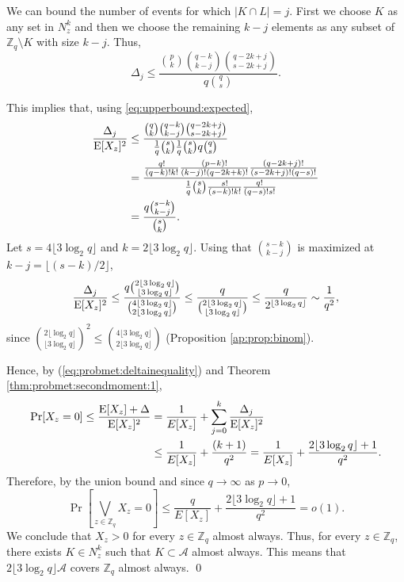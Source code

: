 We can bound the number of events for which $|K \cap L| = j$. First we choose $K$ as any set in $N_z^k$ and then we choose the remaining $k- j$ elements as any subset of $\mathbb{Z}_q \setminus K$ with size $k - j$. Thus, 
\[\Delta_j \leq \frac{\binom{p}{k} \binom{q - k}{k - j}\binom{q - 2k + j}{s - 2k + j}}{q\binom{q}{s}}.\]
\par This implies that, using \ref{eq:upperbound:expected},
\begin{align*}
    \frac{\Delta_j}{\mathrm{E}[X_z]^2} &\leq \frac{\binom{q}{k} \binom{q - k}{k - j}\binom{q - 2k + j}{s - 2k + j}}{\frac{1}{q} \binom{s}{k}\frac{1}{q} \binom{s}{k}q\binom{q}{s}} \\
    &= \frac{\frac{q!}{(q - k)!k!}\frac{(p - k)!}{(k - j)!(q - 2k + k)!}\frac{(q - 2k + j)!}{(s - 2k + j)!(q - s)!}}{\frac{1}{q}\binom{s}{k}\frac{s!}{(s - k)!k!}\frac{q!}{(q - s)!s!}} \\
    &= \frac{q\binom{s - k}{k - j}}{\binom{s}{k}}.
\end{align*}
Let $s = 4\lfloor 3 \log_2 q \rfloor$ and $k = 2\lfloor 3 \log_2 q \rfloor$. Using that $\binom{s - k}{k - j}$ is maximized at $k - j = \lfloor (s - k) / 2\rfloor$,
\begin{align*}
\frac{\Delta_j}{\mathrm{E}[X_z]^2} \leq \frac{q \binom{2\lfloor 3 \log_2 q\rfloor}{\lfloor 3 \log_2 q \rfloor}}{\binom{4\lfloor 3\log_2 q \rfloor}{2\lfloor 3\log_2 q \rfloor}} \leq \frac{q}{\binom{2\lfloor 3 \log_2 q \rfloor }{ \lfloor 3 \log_2 q \rfloor}} \leq \frac{q}{2^{\lfloor 3 \log_2 q \rfloor}} \sim \frac{1}{q^2},
\end{align*}
since \(\binom{2\lfloor \log_2 q \rfloor}{\lfloor 3 \log_2 q \rfloor}^2 \leq \binom{4\lfloor 3 \log_2 q \rfloor }{2\lfloor 3 \log_2 q \rfloor}\) (Proposition \ref{ap:prop:binom}).   \par
Hence, by (\ref{eq:probmet:deltainequality}) and Theorem \ref{thm:probmet:secondmoment:1},
\begin{align*}
\mathrm{Pr}[X_z = 0] \leq \frac{\mathrm{E}[X_z] + \Delta}{\mathrm{E}[X_z]^2} &= \frac{1}{E[X_z]} + \sum_{j = 0}^k \frac{\Delta_j}{\mathrm{E}[X_z]^2} \\
&\leq \frac{1}{E[X_z]} + \frac{(k + 1)}{q^2} = \frac{1}{E[X_z]} + \frac{2\lfloor 3 \log_2 q\rfloor + 1}{q^2}.
\end{align*}
Therefore, by the union bound and since $q \to \infty$ as $p \to 0$,
\[\Pr\left[\bigvee_{z \in \mathbb{Z}_q} X_z = 0\right] \leq \frac{q}{E[X_z]} + \frac{2\lfloor 3 \log_2 q\rfloor + 1}{q^2} = o(1).\]
We conclude that $X_z > 0$ for every $z \in \mathbb{Z}_q$ almost always. Thus, for every $z \in \mathbb{Z}_q$, there exists $K \in N_z^k$ such that $K \subset \mathcal{A}$ almost always. This means that $2\lfloor 3 \log_2 q\rfloor \mathcal{A}$ covers $\mathbb{Z}_q$ almost always. \qed

